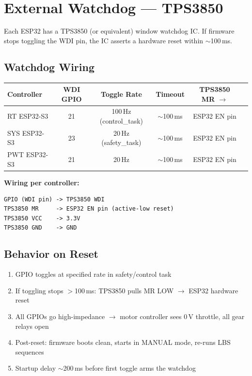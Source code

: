 \documentclass[12pt,a4paper,oneside]{report}
\begin{document}

\chapter{External Watchdog --- TPS3850}

Each ESP32 has a TPS3850 (or equivalent) window watchdog IC. If firmware stops toggling the WDI pin, the IC asserts a hardware reset within $\sim$100\,ms.

\section{Watchdog Wiring}

\begin{center}
\begin{tabular}{lccccl}
\toprule
\textbf{Controller} & \textbf{WDI GPIO} & \textbf{Toggle Rate} & \textbf{Timeout} & \textbf{TPS3850 MR} $\rightarrow$ \\
\midrule
RT ESP32-S3  & 21 & 100\,Hz (control\_task) & $\sim$100\,ms & ESP32 EN pin \\
SYS ESP32-S3 & 23 & 20\,Hz (safety\_task)  & $\sim$100\,ms & ESP32 EN pin \\
PWT ESP32-S3 & 21 & 20\,Hz                 & $\sim$100\,ms & ESP32 EN pin \\
\bottomrule
\end{tabular}
\end{center}

\noindent\textbf{Wiring per controller:}
\begin{lstlisting}
GPIO (WDI pin) -> TPS3850 WDI
TPS3850 MR     -> ESP32 EN pin (active-low reset)
TPS3850 VCC    -> 3.3V
TPS3850 GND    -> GND
\end{lstlisting}

\section{Behavior on Reset}

\begin{enumerate}[leftmargin=*,nosep]
  \item GPIO toggles at specified rate in safety/control task
  \item If toggling stops $>$100\,ms: TPS3850 pulls MR LOW $\rightarrow$ ESP32 hardware reset
  \item All GPIOs go high-impedance $\rightarrow$ motor controller sees 0\,V throttle, all gear relays open
  \item Post-reset: firmware boots clean, starts in MANUAL mode, re-runs LBS sequences
  \item Startup delay $\sim$200\,ms before first toggle arms the watchdog
\end{enumerate}
\end{document}
